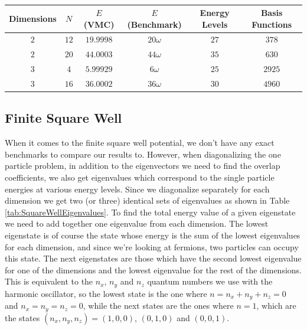 \documentclass[../main.tex]{subfiles}
\begin{document}
\begin{table}[!ht]
  \centering
  \begin{tabular}{ | c | c | c | c | c | c | }
    \hline
    Dimensions & $N$ & $E$ (VMC) & $E$ (Benchmark) &  Energy Levels & Basis Functions\\*
    \hline
    $2$ & $12$ & $19.9998$ & $20\omega$ & $27$ & $378$ \\*
    \hline
    $2$ & $20$ & $44.0003$ & $44\omega$ & $35$ & $630$ \\*
    \hline
    $3$ & $4$ & $5.99929$ & $6\omega$ & $25$ & $2925$ \\*
    \hline
    $3$ & $16$ & $36.0002$ & $36\omega$ & $30$ & $4960$ \\*
    \hline
  \end{tabular}
  \caption{}
  \label{tab:DoubleHOTestCorrected}
\end{table}

\subsection{Finite Square Well}\label{sec: FSW_vmc_test}

When it comes to the finite square well potential, we don't have any exact benchmarks to compare our results to. However, when diagonalizing the one particle problem, in addition to the eigenvectors we need to find the overlap coefficients, we also get eigenvalues which correspond to the single particle energies at various energy levels. Since we diagonalize separately for each dimension we get two (or three) identical sets of eigenvalues as shown in Table \ref{tab:SquareWellEigenvalues}. To find the total energy value of a given eigenstate we need to add together one eigenvalue from each dimension. The lowest eigenstate is of course the state whose energy is the sum of the lowest eigenvalues for each dimension, and since we're looking at fermions, two particles can occupy this state. The next eigenstates are those which have the second lowest eigenvalue for one of the dimensions and the lowest eigenvalue for the rest of the dimensions. This is equivalent to the $n_x$, $n_y$ and $n_z$ quantum numbers we use with the harmonic oscillator, so the lowest state is the one where $n = n_x + n_y + n_z = 0$ and $n_x=n_y=n_z=0$, while the next states are the ones where $n = 1$, which are the states $(n_x,n_y,n_z) = (1,0,0)$, $(0,1,0)$ and $(0,0,1)$.
\end{document}

